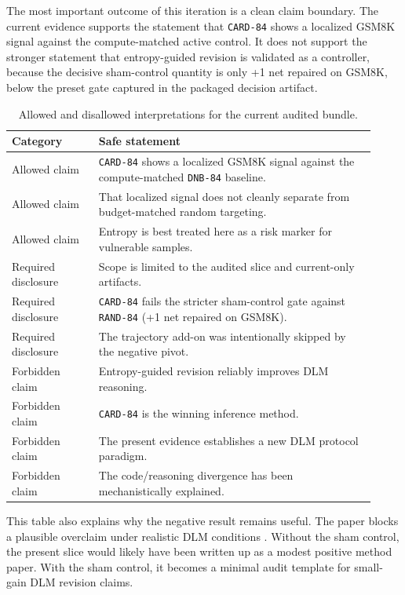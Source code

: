 \documentclass{article}
\begin{document}
The most important outcome of this iteration is a clean claim boundary. The current evidence supports the statement that \texttt{CARD-84} shows a localized GSM8K signal against the compute-matched active control. It does not support the stronger statement that entropy-guided revision is validated as a controller, because the decisive sham-control quantity is only +1 net repaired on GSM8K, below the preset gate captured in the packaged decision artifact.

\begin{table}[t]
\centering
\caption{Allowed and disallowed interpretations for the current audited bundle.}
\label{tab:claim-ceiling}
\begin{tabular}{p{0.22\linewidth}p{0.7\linewidth}}
\toprule
Category & Safe statement \\
\midrule
Allowed claim & \texttt{CARD-84} shows a localized GSM8K signal against the compute-matched \texttt{DNB-84} baseline. \\
Allowed claim & That localized signal does not cleanly separate from budget-matched random targeting. \\
Allowed claim & Entropy is best treated here as a risk marker for vulnerable samples. \\
Required disclosure & Scope is limited to the audited slice and current-only artifacts. \\
Required disclosure & \texttt{CARD-84} fails the stricter sham-control gate against \texttt{RAND-84} (+1 net repaired on GSM8K). \\
Required disclosure & The trajectory add-on was intentionally skipped by the negative pivot. \\
Forbidden claim & Entropy-guided revision reliably improves DLM reasoning. \\
Forbidden claim & \texttt{CARD-84} is the winning inference method. \\
Forbidden claim & The present evidence establishes a new DLM protocol paradigm. \\
Forbidden claim & The code/reasoning divergence has been mechanistically explained. \\
\bottomrule
\end{tabular}
\end{table}

This table also explains why the negative result remains useful. The paper blocks a plausible overclaim under realistic DLM conditions \citep{dpad2025,prism2026}. Without the sham control, the present slice would likely have been written up as a modest positive method paper. With the sham control, it becomes a minimal audit template for small-gain DLM revision claims.
\end{document}
